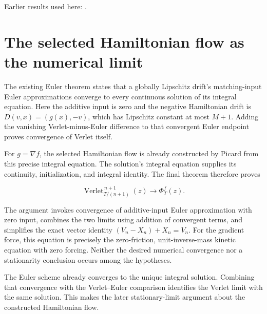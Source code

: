 \documentclass[11pt,a4paper]{article}
\begin{document}
Earlier results used here: \cite[Section~3.16.1]{LangevinLean2026ULASC}.

\section{\texorpdfstring{The selected Hamiltonian flow as the numerical limit}{The selected Hamiltonian flow as the numerical limit}}


The existing Euler theorem states that a globally Lipschitz drift's matching-input Euler approximations converge to every continuous solution of its integral equation. Here the additive input is zero and the negative Hamiltonian drift is \(D(v,x)=(g(x),-v)\), which has Lipschitz constant at most \(M+1\). Adding the vanishing Verlet-minus-Euler difference to that convergent Euler endpoint proves convergence of Verlet itself.



For \(g=\nabla f\), the selected Hamiltonian flow is already constructed by Picard from this precise integral equation. The solution’s integral equation supplies its continuity, initialization, and integral identity. The final theorem therefore proves

\[\operatorname{Verlet}_{T/(n+1)}^{\,n+1}(z)\longrightarrow\Phi_T^f(z).\]

The argument invokes convergence of additive-input Euler approximation with zero input, combines the two limits using addition of convergent terms, and simplifies the exact vector identity \((V_n-X_n)+X_n=V_n\). For the gradient force, this equation is precisely the zero-friction, unit-inverse-mass kinetic equation with zero forcing. Neither the desired numerical convergence nor a stationarity conclusion occurs among the hypotheses.



The Euler scheme already converges to the unique integral solution. Combining that convergence with the Verlet–Euler comparison identifies the Verlet limit with the same solution. This makes the later stationary-limit argument about the constructed Hamiltonian flow.
\end{document}
